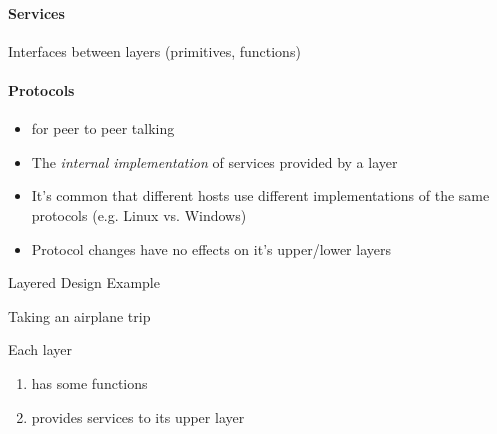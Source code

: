 \paragraph{Services}

Interfaces between layers (primitives, functions)

\paragraph{Protocols}

\begin{itemize}
\item for peer to peer talking
\item The \emph{internal implementation} of services provided by a layer
\item It's common that different hosts use different implementations of the same protocols
  (e.g. Linux vs. Windows)
\item Protocol changes have no effects on it's upper/lower layers
\end{itemize}

\begin{frame}{Layered Design Example}
  \begin{iblock}{Taking an airplane trip}
    \begin{center}
    \end{center}
    Each layer
    \begin{enumerate}
    \item has some functions
    \item provides services to its upper layer
    \end{enumerate}
  \end{iblock}
\end{frame}

